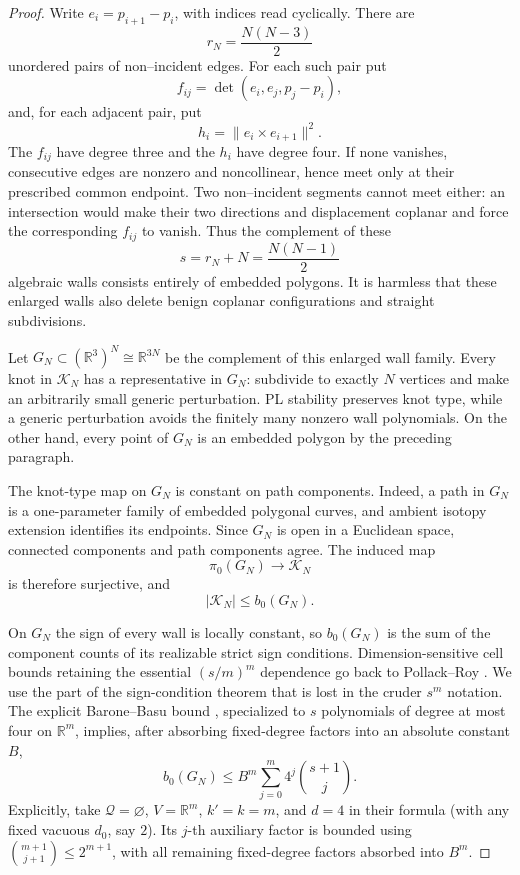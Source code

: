\documentclass[11pt]{article}
\theoremstyle{remark}
\theoremstyle{plain}
\newcommand{\R}{\mathbb{R}}
\newcommand{\Kcal}{\mathcal{K}}
\begin{document}
\begin{proof}
Write \(e_i=p_{i+1}-p_i\), with indices read cyclically.  There are
\[
    r_N=\frac{N(N-3)}{2}
\]
unordered pairs of non--incident edges.  For each such pair put
\[
    f_{ij}=\det(e_i,e_j,p_j-p_i),
\]
and, for each adjacent pair, put
\[
    h_i=\|e_i\times e_{i+1}\|^2.
\]
The \(f_{ij}\) have degree three and the \(h_i\) have degree four.  If none
vanishes, consecutive edges are nonzero and noncollinear, hence meet only at
their prescribed common endpoint.  Two non--incident segments cannot meet
either: an intersection would make their two directions and displacement
coplanar and force the corresponding \(f_{ij}\) to vanish.  Thus the complement
of these
\[
    s=r_N+N=\frac{N(N-1)}2
\]
algebraic walls consists entirely of embedded polygons.  It is harmless that
these enlarged walls also delete benign coplanar configurations and straight
subdivisions.

Let \(G_N\subset(\R^3)^N\cong\R^{3N}\) be the complement of this enlarged
wall family.  Every knot in \(\Kcal_N\) has a representative in \(G_N\):
subdivide to exactly \(N\) vertices and make an arbitrarily small generic
perturbation.  PL stability preserves knot type, while a generic perturbation
avoids the finitely many nonzero wall polynomials.  On the other hand, every
point of \(G_N\) is an embedded polygon by the preceding paragraph.

The knot-type map on \(G_N\) is constant on path components.  Indeed, a path
in \(G_N\) is a one-parameter family of embedded polygonal curves, and ambient
isotopy extension identifies its endpoints.  Since \(G_N\) is open in a
Euclidean space, connected components and path components agree.  The induced
map
\[
    \pi_0(G_N)\longrightarrow\Kcal_N
\]
is therefore surjective, and
\[
    |\Kcal_N|\le b_0(G_N).
\]

On \(G_N\) the sign of every wall is locally constant, so \(b_0(G_N)\) is the
sum of the component counts of its realizable strict sign conditions.
Dimension-sensitive cell bounds retaining the
essential \((s/m)^m\) dependence go back to Pollack--Roy
\cite{PollackRoy}.  We use the part of the sign-condition theorem that is lost in the cruder
\(s^m\) notation.  The explicit Barone--Basu bound
\cite[Theorem 1.1]{BaroneBasu}, specialized to \(s\) polynomials of degree at
most four on \(\R^m\), implies, after absorbing fixed-degree factors into
an absolute constant \(B\),
\[
 b_0(G_N)
 \le B^m\sum_{j=0}^{m}4^j\binom{s+1}{j}.
\]
Explicitly, take
\(\mathcal Q=\varnothing\), \(V=\R^m\), \(k'=k=m\), and \(d=4\) in their
formula (with any fixed vacuous \(d_0\), say \(2\)).  Its \(j\)-th auxiliary
factor is bounded using
\(\binom{m+1}{j+1}\le2^{m+1}\), with all remaining fixed-degree factors
absorbed into \(B^m\).


\end{proof}
\end{document}
